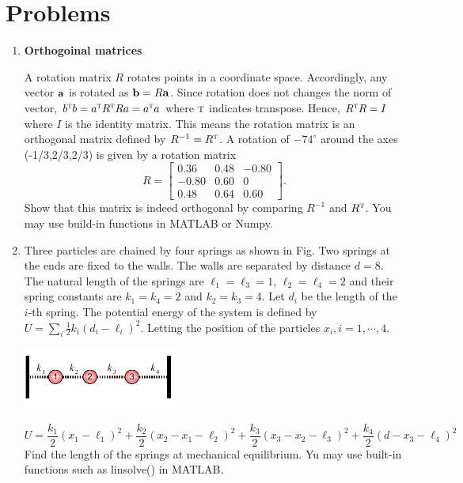 \section{Problems}

\begin{enumerate}[labelwidth=0.5cm,labelindent=0cm,leftmargin=*,label=\bfseries \thechapter.\arabic*,align=left]

\item \textbf{Orthogoinal matrices}\label{pr:rotation}

A rotation matrix $R$ rotates points in a coordinate space.  Accordingly, any vector $\vb{a}$ is rotated as  $\vb{b} = R \vb{a}$. Since rotation does not changes the norm of vector, $b^\textsc{t} b = a^\textsc{t} R^\textsc{t} R a = a^\textsc{t} a$ where $\textsc{t}$ indicates transpose.  Hence, $R^\textsc{t} R = I$ where $I$ is the identity matrix.  This means the rotation matrix is an orthogonal matrix defined by $R^{-1} = R^\textsc{t}$.  A rotation of $-74^\circ$ around the axes (-1/3,2/3,2/3) is given by a rotation matrix
\begin{equation}
R = \begin{bmatrix} 0.36&0.48&-0.80\\-0.80&0.60&0\\0.48&0.64&0.60 \end{bmatrix}.
\end{equation}
Show that this matrix is indeed orthogonal by comparing $R^{-1}$ and $R^\textsc{t}$.  You may use build-in functions in MATLAB or Numpy.

\item 
\begin{minipage}[t]{4in}
Three particles are chained by four springs as shown in Fig.  Two springs at the ends are fixed to the walls.  The walls are separated by distance $d=8$.
The natural length of the springs are $\ell_1=\ell_3=1$, $\ell_2=\ell_4=2$ and their spring constants are
$k_1=k_4=2$ and $k_2=k_3=4$.
Let $d_i$ be the length of the $i$-th spring.  The potential energy of the system is defined by $U=\sum_{i} \frac{1}{2} k_i (d_i - \ell_i)^2$.
Letting the position of the particles $x_i,  i=1,\cdots, 4$.  
\end{minipage}
\begin{minipage}{2.3in}
   
   \vspace{1in}
   \begin{center}
      \includegraphics[width=2in]{08.matrix1/spring_chain.pdf}
   \end{center}
\end{minipage}
\begin{equation}\label{eq:coupled_osc_potential}
   U = \frac{k_1}{2} (x_1-\ell_1)^2 + \frac{k_2}{2} (x_2-x_1-\ell_2)^2 + \frac{k_3}{2} (x_3-x_2-\ell_3)^2+\frac{k_4}{2} (d-x_3-\ell_4)^2
\end{equation}
Find the length of the springs at mechanical equilibrium. Yu may use built-in functions such as linsolve() in MATLAB.


\end{enumerate}
